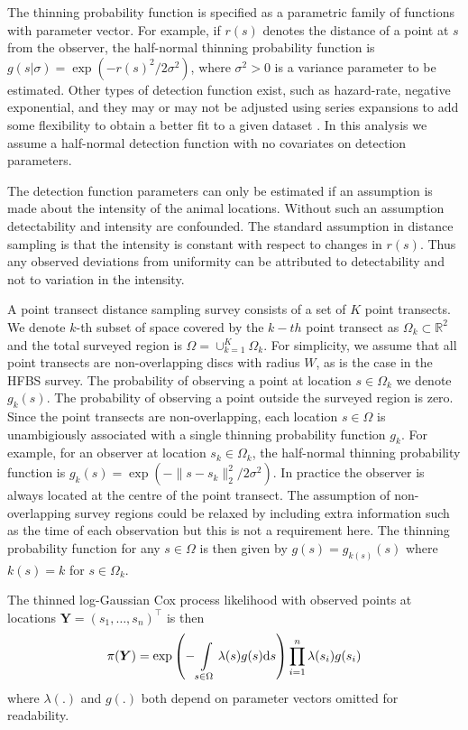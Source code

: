 \documentclass[preprint,12pt]{elsarticle}
\newcommand{\bm}{\boldsymbol}  %
\begin{document}
The thinning probability function is specified as a parametric family of functions with parameter vector.  For example, if $r(s)$ denotes the distance of a point at $s$ from the observer, the half-normal thinning probability function is $g(s | \sigma) = \exp(-r(s)^2 / 2\sigma^2)$, where $\sigma^2 > 0$ is a variance parameter to be estimated.  Other types of detection function exist, such as hazard-rate, negative exponential, and they may or may not be adjusted using series expansions to add some flexibility to obtain a better fit to a given dataset \citep{buckland_distance_2015}.  In this analysis we assume a half-normal detection function with no covariates on detection parameters.

The detection function parameters can only be estimated if an assumption is made about the intensity of the animal locations.  Without such an assumption detectability and intensity are confounded.  The standard assumption in distance sampling is that the intensity is constant with respect to changes in $r(s)$.  Thus any observed deviations from uniformity can be attributed to detectability and not to variation in the intensity.

A point transect distance sampling survey consists of a set of $K$ point transects.   We denote $k$-th subset of space covered by the $k-th$ point transect as $\Omega_k \subset \mathbb{R}^2$ and the total surveyed region is $\Omega = \cup_{k=1}^K \Omega_k$.  For simplicity, we assume that all point transects are non-overlapping discs with radius $W$, as is the case in the HFBS survey.  The probability of observing a point at location $s \in \Omega_k$ we denote $g_k(s)$.  The probability of observing a point outside the surveyed region is zero.
Since the point transects are non-overlapping, each location $s \in \Omega$ is unambigiously associated with a single thinning probability function $g_k$.  For example, for an observer at location $s_k \in \Omega_k$, the half-normal thinning probability function is $g_k(s) = \exp(-\lVert s - s_k \rVert_2^2 / 2\sigma^2)$.  In practice the observer is always located at the centre of the point transect.  The assumption of non-overlapping survey regions could be relaxed by including extra information such as the time of each observation but this is not a requirement here.  The thinning probability function for any $s \in \Omega$ is then given by $g(s) = g_{k(s)}(s)$ where $k(s) = k$ for $s \in \Omega_k$.

The thinned log-Gaussian Cox process likelihood with observed points at locations $\bm{Y} = (s_1, \ldots, s_n)^\intercal$ is then
\begin{equation}
\label{lgcp-likelihood}
\pi(\bm{Y}) = \exp\left(-\int\displaylimits_{s \in \Omega} \lambda(s) g(s) \mathrm{d}s \right)\prod_{i=1}^n \lambda(s_i)g(s_i)
\end{equation}
where $\lambda(.)$ and $g(.)$ both depend on parameter vectors omitted for readability.  
\end{document}
